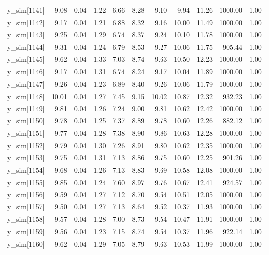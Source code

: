 \begin{table}[ht]
\begin{tabular}{rrrrrrrrrrr}
  y\_sim[1141] & 9.08 & 0.04 & 1.22 & 6.66 & 8.28 & 9.10 & 9.94 & 11.26 & 1000.00 & 1.00 \\ 
  y\_sim[1142] & 9.17 & 0.04 & 1.21 & 6.88 & 8.32 & 9.16 & 10.00 & 11.49 & 1000.00 & 1.00 \\ 
  y\_sim[1143] & 9.25 & 0.04 & 1.29 & 6.74 & 8.37 & 9.24 & 10.10 & 11.78 & 1000.00 & 1.00 \\ 
  y\_sim[1144] & 9.31 & 0.04 & 1.24 & 6.79 & 8.53 & 9.27 & 10.06 & 11.75 & 905.44 & 1.00 \\ 
  y\_sim[1145] & 9.62 & 0.04 & 1.33 & 7.03 & 8.74 & 9.63 & 10.50 & 12.23 & 1000.00 & 1.00 \\ 
  y\_sim[1146] & 9.17 & 0.04 & 1.31 & 6.74 & 8.24 & 9.17 & 10.04 & 11.89 & 1000.00 & 1.00 \\ 
  y\_sim[1147] & 9.26 & 0.04 & 1.23 & 6.89 & 8.40 & 9.26 & 10.06 & 11.79 & 1000.00 & 1.00 \\ 
  y\_sim[1148] & 10.01 & 0.04 & 1.27 & 7.45 & 9.15 & 10.02 & 10.87 & 12.32 & 932.23 & 1.00 \\ 
  y\_sim[1149] & 9.81 & 0.04 & 1.26 & 7.24 & 9.00 & 9.81 & 10.62 & 12.42 & 1000.00 & 1.00 \\ 
  y\_sim[1150] & 9.78 & 0.04 & 1.25 & 7.37 & 8.89 & 9.78 & 10.60 & 12.26 & 882.12 & 1.00 \\ 
  y\_sim[1151] & 9.77 & 0.04 & 1.28 & 7.38 & 8.90 & 9.86 & 10.63 & 12.28 & 1000.00 & 1.00 \\ 
  y\_sim[1152] & 9.79 & 0.04 & 1.30 & 7.26 & 8.91 & 9.80 & 10.62 & 12.35 & 1000.00 & 1.00 \\ 
  y\_sim[1153] & 9.75 & 0.04 & 1.31 & 7.13 & 8.86 & 9.75 & 10.60 & 12.25 & 901.26 & 1.00 \\ 
  y\_sim[1154] & 9.68 & 0.04 & 1.26 & 7.13 & 8.83 & 9.69 & 10.58 & 12.08 & 1000.00 & 1.00 \\ 
  y\_sim[1155] & 9.85 & 0.04 & 1.24 & 7.60 & 8.97 & 9.76 & 10.67 & 12.41 & 924.57 & 1.00 \\ 
  y\_sim[1156] & 9.59 & 0.04 & 1.27 & 7.12 & 8.70 & 9.54 & 10.51 & 12.05 & 1000.00 & 1.00 \\ 
  y\_sim[1157] & 9.50 & 0.04 & 1.27 & 7.13 & 8.64 & 9.52 & 10.37 & 11.93 & 1000.00 & 1.00 \\ 
  y\_sim[1158] & 9.57 & 0.04 & 1.28 & 7.00 & 8.73 & 9.54 & 10.47 & 11.91 & 1000.00 & 1.00 \\ 
  y\_sim[1159] & 9.56 & 0.04 & 1.23 & 7.15 & 8.74 & 9.54 & 10.37 & 11.96 & 922.14 & 1.00 \\ 
  y\_sim[1160] & 9.62 & 0.04 & 1.29 & 7.05 & 8.79 & 9.63 & 10.53 & 11.99 & 1000.00 & 1.00 \\ 

\end{tabular}
\end{table}
